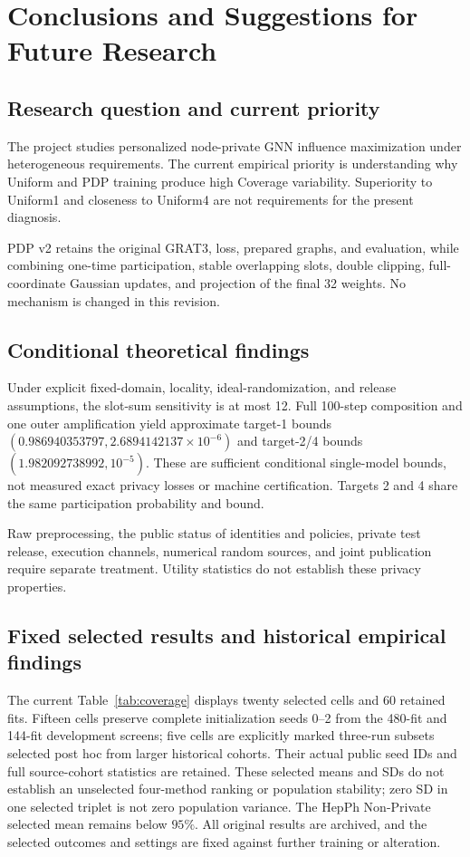 \chapter{Conclusions and Suggestions for Future Research}\label{ch:conclusion}
\section{Research question and current priority}
The project studies personalized node-private GNN influence maximization under heterogeneous requirements. The current empirical priority is understanding why Uniform and PDP training produce high Coverage variability. Superiority to Uniform1 and closeness to Uniform4 are not requirements for the present diagnosis.

PDP v2 retains the original GRAT3, loss, prepared graphs, and evaluation, while combining one-time participation, stable overlapping slots, double clipping, full-coordinate Gaussian updates, and projection of the final 32 weights. No mechanism is changed in this revision.

\section{Conditional theoretical findings}
Under explicit fixed-domain, locality, ideal-randomization, and release assumptions, the slot-sum sensitivity is at most 12. Full 100-step composition and one outer amplification yield approximate target-1 bounds $(0.986940353797,2.6894142137\times10^{-6})$ and target-2/4 bounds $(1.982092738992,10^{-5})$. These are sufficient conditional single-model bounds, not measured exact privacy losses or machine certification. Targets 2 and 4 share the same participation probability and bound.

Raw preprocessing, the public status of identities and policies, private test release, execution channels, numerical random sources, and joint publication require separate treatment. Utility statistics do not establish these privacy properties.

\section{Fixed selected results and historical empirical findings}
The current Table~\ref{tab:coverage} displays twenty selected cells and 60 retained fits. Fifteen cells preserve complete initialization seeds 0--2 from the 480-fit and 144-fit development screens; five cells are explicitly marked three-run subsets selected post hoc from larger historical cohorts. Their actual public seed IDs and full source-cohort statistics are retained. These selected means and SDs do not establish an unselected four-method ranking or population stability; zero SD in one selected triplet is not zero population variance. The HepPh Non-Private selected mean remains below $95\%$. All original results are archived, and the selected outcomes and settings are fixed against further training or alteration.

